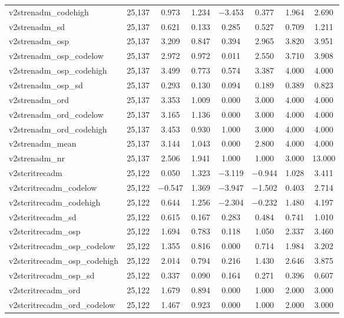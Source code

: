 \begin{table}[!htbp]
\begin{tabular}{@{\extracolsep{5pt}}lccccccc}
v2strenadm\_codehigh & 25,137 & 0.973 & 1.234 & $-$3.453 & 0.377 & 1.964 & 2.690 \\ 
v2strenadm\_sd & 25,137 & 0.621 & 0.133 & 0.285 & 0.527 & 0.709 & 1.211 \\ 
v2strenadm\_osp & 25,137 & 3.209 & 0.847 & 0.394 & 2.965 & 3.820 & 3.951 \\ 
v2strenadm\_osp\_codelow & 25,137 & 2.972 & 0.972 & 0.011 & 2.550 & 3.710 & 3.908 \\ 
v2strenadm\_osp\_codehigh & 25,137 & 3.499 & 0.773 & 0.574 & 3.387 & 4.000 & 4.000 \\ 
v2strenadm\_osp\_sd & 25,137 & 0.293 & 0.130 & 0.094 & 0.189 & 0.389 & 0.823 \\ 
v2strenadm\_ord & 25,137 & 3.353 & 1.009 & 0.000 & 3.000 & 4.000 & 4.000 \\ 
v2strenadm\_ord\_codelow & 25,137 & 3.165 & 1.136 & 0.000 & 3.000 & 4.000 & 4.000 \\ 
v2strenadm\_ord\_codehigh & 25,137 & 3.453 & 0.930 & 1.000 & 3.000 & 4.000 & 4.000 \\ 
v2strenadm\_mean & 25,137 & 3.144 & 1.043 & 0.000 & 2.800 & 4.000 & 4.000 \\ 
v2strenadm\_nr & 25,137 & 2.506 & 1.941 & 1.000 & 1.000 & 3.000 & 13.000 \\ 
v2stcritrecadm & 25,122 & 0.050 & 1.323 & $-$3.119 & $-$0.944 & 1.028 & 3.411 \\ 
v2stcritrecadm\_codelow & 25,122 & $-$0.547 & 1.369 & $-$3.947 & $-$1.502 & 0.403 & 2.714 \\ 
v2stcritrecadm\_codehigh & 25,122 & 0.644 & 1.256 & $-$2.304 & $-$0.232 & 1.480 & 4.197 \\ 
v2stcritrecadm\_sd & 25,122 & 0.615 & 0.167 & 0.283 & 0.484 & 0.741 & 1.010 \\ 
v2stcritrecadm\_osp & 25,122 & 1.694 & 0.783 & 0.118 & 1.050 & 2.337 & 3.460 \\ 
v2stcritrecadm\_osp\_codelow & 25,122 & 1.355 & 0.816 & 0.000 & 0.714 & 1.984 & 3.202 \\ 
v2stcritrecadm\_osp\_codehigh & 25,122 & 2.014 & 0.794 & 0.216 & 1.430 & 2.646 & 3.875 \\ 
v2stcritrecadm\_osp\_sd & 25,122 & 0.337 & 0.090 & 0.164 & 0.271 & 0.396 & 0.607 \\ 
v2stcritrecadm\_ord & 25,122 & 1.679 & 0.894 & 0.000 & 1.000 & 2.000 & 3.000 \\ 
v2stcritrecadm\_ord\_codelow & 25,122 & 1.467 & 0.923 & 0.000 & 1.000 & 2.000 & 3.000 \\ 

\end{tabular}
\end{table}
